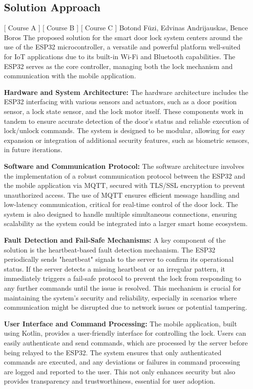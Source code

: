 \subsection{Solution Approach}
[ Course A ] [ Course B ] [ Course C ] 
\newline
Botond Füzi, Edvinas Andrijauskas, Bence Boros 
\newline
The proposed solution for the smart door lock system centers around the use of the ESP32 microcontroller, a versatile and powerful platform well-suited for IoT applications due to its built-in Wi-Fi and Bluetooth capabilities. The ESP32 serves as the core controller, managing both the lock mechanism and communication with the mobile application.

\textbf{Hardware and System Architecture:}
The hardware architecture includes the ESP32 interfacing with various sensors and actuators, such as a door position sensor, a lock state sensor, and the lock motor itself. These components work in tandem to ensure accurate detection of the door’s status and reliable execution of lock/unlock commands. The system is designed to be modular, allowing for easy expansion or integration of additional security features, such as biometric sensors, in future iterations.

\textbf{Software and Communication Protocol:}
The software architecture involves the implementation of a robust communication protocol between the ESP32 and the mobile application via MQTT, secured with TLS/SSL encryption to prevent unauthorized access. The use of MQTT ensures efficient message handling and low-latency communication, critical for real-time control of the door lock. The system is also designed to handle multiple simultaneous connections, ensuring scalability as the system could be integrated into a larger smart home ecosystem.

\textbf{Fault Detection and Fail-Safe Mechanisms:}
A key component of the solution is the heartbeat-based fault detection mechanism. The ESP32 periodically sends "heartbeat" signals to the server to confirm its operational status. If the server detects a missing heartbeat or an irregular pattern, it immediately triggers a fail-safe protocol to prevent the lock from responding to any further commands until the issue is resolved. This mechanism is crucial for maintaining the system’s security and reliability, especially in scenarios where communication might be disrupted due to network issues or potential tampering.

\textbf{User Interface and Command Processing:}
The mobile application, built using Kotlin, provides a user-friendly interface for controlling the lock. Users can easily authenticate and send commands, which are processed by the server before being relayed to the ESP32. The system ensures that only authenticated commands are executed, and any deviations or failures in command processing are logged and reported to the user. This not only enhances security but also provides transparency and trustworthiness, essential for user adoption.

